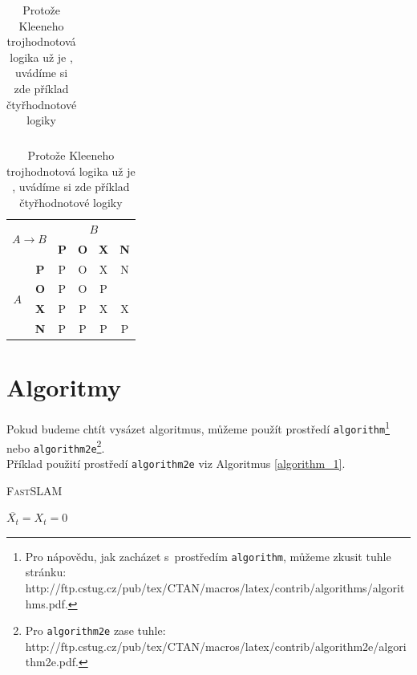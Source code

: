 \documentclass[a4paper,11pt]{article}
\begin{document}
\begin{table}[h]
\begin{tabular}{|c|c|c|c|c|c|}
\end{tabular}
\begin{tabular}{|c|c|c|c|c|c|} \hline \multicolumn{2}{|c|}{\multirow{2}{*}{$A \rightarrow B$}} & \multicolumn{4}{c|}{$B$} \\ \cline{3-6} \multicolumn{2}{|c|}{}  & \textbf{P} & \textbf{O} & \textbf{X} & \textbf{N} \\ \hline \multirow{4}{*}{$A$} & \textbf{P} & P & O & X & N \\ \cline{2-6} & \textbf{O} & P & O & P & \\ \cline{2-6} & \textbf{X} & P & P & X & X \\ \cline{2-6} & \textbf{N} & P & P & P & P \\ \hline
\end{tabular}
\smallskip
\caption{Protože Kleeneho trojhodnotová logika už je , uvádíme si zde příklad čtyřhodnotové logiky}
\bigskip
\label{logika}
\end{table}

\section{Algoritmy}
\label{sec_3}
Pokud budeme chtít vysázet algoritmus, můžeme použít prostředí \texttt{algorithm}\footnote{Pro nápovědu, jak zacházet s~prostředím \texttt{algorithm}, můžeme zkusit tuhle stránku:\\ http://ftp.cstug.cz/pub/tex/CTAN/macros/latex/contrib/algorithms/algorithms.pdf.} nebo \texttt{algorithm2e}\footnote{Pro \texttt{algorithm2e} zase tuhle: http://ftp.cstug.cz/pub/tex/CTAN/macros/latex/contrib/algorithm2e/algorithm2e.pdf.}.\\ Příklad použití prostředí \texttt{algorithm2e} viz Algoritmus \ref{algorithm_1}. \\
\bigskip

\begin{algorithm}[H]
\label{algorithm_1}
\caption{\textsc{Fast}\uppercase{slam}}
\SetNlSty{}{}{:}
\SetAlgoNoLine
\SetNlSkip{-0.5cm}
\BlankLine
\Indp \Indp
{}
$\overline{X_{t}} = X_{t} = 0$\\
\end{algorithm}
\bigskip \smallskip
\end{document}
